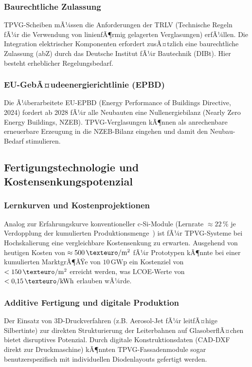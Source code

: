 ﻿\documentclass[a4paper,12pt]{article}
\theoremstyle{definition}
\theoremstyle{remark}
\begin{document}
\subsubsection{Baurechtliche Zulassung}
TPVG-Scheiben mÃ¼ssen die Anforderungen der TRLV (Technische Regeln
fÃ¼r die Verwendung von linienfÃ¶rmig gelagerten Verglasungen) erfÃ¼llen.
Die Integration elektrischer Komponenten erfordert zusÃ¤tzlich eine
baurechtliche Zulassung (abZ) durch das Deutsche Institut fÃ¼r
Bautechnik (DIBt). Hier besteht erheblicher Regelungsbedarf.

\subsubsection{EU-GebÃ¤udeenergierichtlinie (EPBD)}
Die Ã¼berarbeitete EU-EPBD (Energy Performance of Buildings Directive,
2024) fordert ab 2028 fÃ¼r alle Neubauten eine Nullenergiebilanz
(Nearly Zero Energy Buildings, NZEB). TPVG-Verglasungen kÃ¶nnen
als anrechenbare erneuerbare Erzeugung in die NZEB-Bilanz eingehen
und damit den Neubau-Bedarf stimulieren.

\subsection{Fertigungstechnologie und Kostensenkungspotenzial}

\subsubsection{Lernkurven und Kostenprojektionen}
Analog zur Erfahrungskurve konventioneller c-Si-Module
(Lernrate $\approx 22\,\%$ je Verdopplung der kumulierten
Produktionsmenge~\cite{Fraunhofer2022}) ist fÃ¼r TPVG-Systeme bei
Hochskalierung eine vergleichbare Kostensenkung zu erwarten.
Ausgehend von heutigen Kosten von $\approx 500\,\mathrm{\texteuro/m^2}$
fÃ¼r Prototypen kÃ¶nnte bei einer kumulierten MarktgrÃ¶ÃŸe von
$10\,\mathrm{GWp}$ ein Kostenziel von $<150\,\mathrm{\texteuro/m^2}$
erreicht werden, was LCOE-Werte von $<0{,}15\,\mathrm{\texteuro/kWh}$
erlauben wÃ¼rde.

\subsubsection{Additive Fertigung und digitale Produktion}
Der Einsatz von 3D-Druckverfahren (z.B. Aerosol-Jet fÃ¼r leitfÃ¤hige
Silbertinte) zur direkten Strukturierung der Leiterbahnen auf
GlasoberflÃ¤chen bietet disruptives Potenzial. Durch digitale
Konstruktionsdaten (CAD-DXF direkt zur Druckmaschine) kÃ¶nnten
TPVG-Fassadenmodule sogar benutzerspezifisch mit individuellen
Diodenlayouts gefertigt werden.
\end{document}
